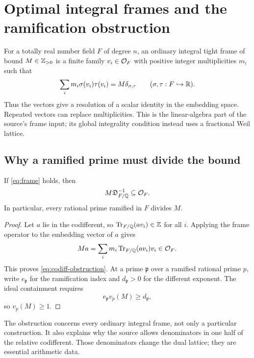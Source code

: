 \section{Optimal integral frames and the ramification obstruction}
\label{sec:frames}

For a totally real number field $F$ of degree $n$, an ordinary integral tight frame of bound $M\in\mathbb Z_{>0}$ is a finite family $v_i\in\mathcal O_F$ with positive integer multiplicities $m_i$ such that
\begin{equation}\label{eq:frame}
 \sum_i m_i\sigma(v_i)\tau(v_i)=M\delta_{\sigma,\tau}
 \qquad(\sigma,\tau:F\hookrightarrow\mathbb R).
\end{equation}
Thus the vectors give a resolution of a scalar identity in the embedding space. Repeated vectors can replace multiplicities. This is the linear-algebra part of the source's frame input; its global integrality condition instead uses a fractional Weil lattice.

\subsection{Why a ramified prime must divide the bound}

\begin{theorem}\label{thm:dual-obstruction}
If \eqref{eq:frame} holds, then
\begin{equation}\label{eq:codiff-obstruction}
 M\mathfrak D_{F/\mathbb Q}^{-1}\subseteq\mathcal O_F.
\end{equation}
In particular, every rational prime ramified in $F$ divides $M$.
\end{theorem}

\begin{proof}
Let $a$ lie in the codifferent, so $\operatorname{Tr}_{F/\mathbb Q}(a v_i)\in\mathbb Z$ for all $i$. Applying the frame operator to the embedding vector of $a$ gives
\[
 M a=\sum_i m_i\operatorname{Tr}_{F/\mathbb Q}(a v_i)v_i\in\mathcal O_F.
\]
This proves \eqref{eq:codiff-obstruction}. At a prime $\mathfrak p$ over a ramified rational prime $p$, write $e_{\mathfrak p}$ for the ramification index and $d_{\mathfrak p}>0$ for the different exponent. The ideal containment requires
\[
 e_{\mathfrak p}v_p(M)\ge d_{\mathfrak p},
\]
so $v_p(M)\ge1$.
\end{proof}

The obstruction concerns every ordinary integral frame, not only a particular construction. It also explains why the source allows denominators in one half of the relative codifferent. Those denominators change the dual lattice; they are essential arithmetic data.

